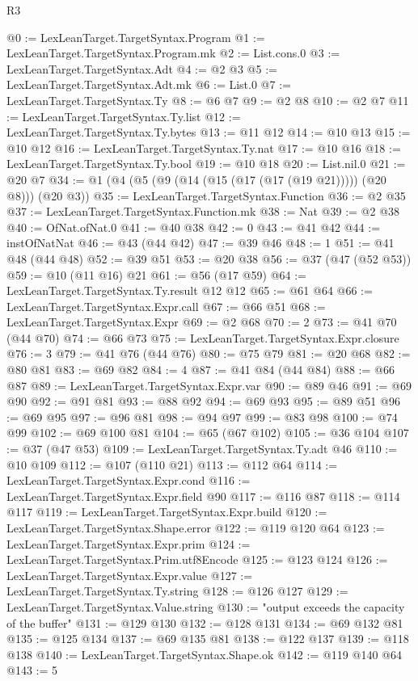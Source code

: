 \begin{lexlean}{R3}
\begin{coremodule}
@0 := LexLeanTarget.TargetSyntax.Program
@1 := LexLeanTarget.TargetSyntax.Program.mk
@2 := List.cons.{0}
@3 := LexLeanTarget.TargetSyntax.Adt
@4 := @2 @3
@5 := LexLeanTarget.TargetSyntax.Adt.mk
@6 := List.{0}
@7 := LexLeanTarget.TargetSyntax.Ty
@8 := @6 @7
@9 := @2 @8
@10 := @2 @7
@11 := LexLeanTarget.TargetSyntax.Ty.list
@12 := LexLeanTarget.TargetSyntax.Ty.bytes
@13 := @11 @12
@14 := @10 @13
@15 := @10 @12
@16 := LexLeanTarget.TargetSyntax.Ty.nat
@17 := @10 @16
@18 := LexLeanTarget.TargetSyntax.Ty.bool
@19 := @10 @18
@20 := List.nil.{0}
@21 := @20 @7
@34 := @1 (@4 (@5 (@9 (@14 (@15 (@17 (@17 (@19 @21))))) (@20 @8))) (@20 @3))
@35 := LexLeanTarget.TargetSyntax.Function
@36 := @2 @35
@37 := LexLeanTarget.TargetSyntax.Function.mk
@38 := Nat
@39 := @2 @38
@40 := OfNat.ofNat.{0}
@41 := @40 @38
@42 := 0
@43 := @41 @42
@44 := instOfNatNat
@46 := @43 (@44 @42)
@47 := @39 @46
@48 := 1
@51 := @41 @48 (@44 @48)
@52 := @39 @51
@53 := @20 @38
@56 := @37 (@47 (@52 @53))
@59 := @10 (@11 @16) @21
@61 := @56 (@17 @59)
@64 := LexLeanTarget.TargetSyntax.Ty.result @12 @12
@65 := @61 @64
@66 := LexLeanTarget.TargetSyntax.Expr.call
@67 := @66 @51
@68 := LexLeanTarget.TargetSyntax.Expr
@69 := @2 @68
@70 := 2
@73 := @41 @70 (@44 @70)
@74 := @66 @73
@75 := LexLeanTarget.TargetSyntax.Expr.closure
@76 := 3
@79 := @41 @76 (@44 @76)
@80 := @75 @79
@81 := @20 @68
@82 := @80 @81
@83 := @69 @82
@84 := 4
@87 := @41 @84 (@44 @84)
@88 := @66 @87
@89 := LexLeanTarget.TargetSyntax.Expr.var
@90 := @89 @46
@91 := @69 @90
@92 := @91 @81
@93 := @88 @92
@94 := @69 @93
@95 := @89 @51
@96 := @69 @95
@97 := @96 @81
@98 := @94 @97
@99 := @83 @98
@100 := @74 @99
@102 := @69 @100 @81
@104 := @65 (@67 @102)
@105 := @36 @104
@107 := @37 (@47 @53)
@109 := LexLeanTarget.TargetSyntax.Ty.adt @46
@110 := @10 @109
@112 := @107 (@110 @21)
@113 := @112 @64
@114 := LexLeanTarget.TargetSyntax.Expr.cond
@116 := LexLeanTarget.TargetSyntax.Expr.field @90
@117 := @116 @87
@118 := @114 @117
@119 := LexLeanTarget.TargetSyntax.Expr.build
@120 := LexLeanTarget.TargetSyntax.Shape.error
@122 := @119 @120 @64
@123 := LexLeanTarget.TargetSyntax.Expr.prim
@124 := LexLeanTarget.TargetSyntax.Prim.utf8Encode
@125 := @123 @124
@126 := LexLeanTarget.TargetSyntax.Expr.value
@127 := LexLeanTarget.TargetSyntax.Ty.string
@128 := @126 @127
@129 := LexLeanTarget.TargetSyntax.Value.string
@130 := "output exceeds the capacity of the buffer"
@131 := @129 @130
@132 := @128 @131
@134 := @69 @132 @81
@135 := @125 @134
@137 := @69 @135 @81
@138 := @122 @137
@139 := @118 @138
@140 := LexLeanTarget.TargetSyntax.Shape.ok
@142 := @119 @140 @64
@143 := 5

\end{coremodule}
\end{lexlean}
